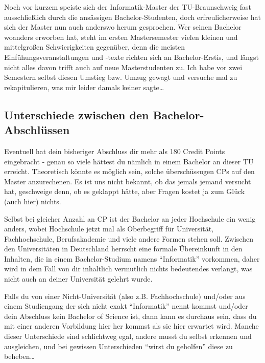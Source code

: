 \begin{multicols}{2}
\label{master}


Noch vor kurzem speiste sich der Informatik-Master der TU-Braunschweig fast ausschließlich durch die ansässigen Bachelor-Studenten, doch erfreulicherweise hat sich der Master nun auch anderswo herum gesprochen. Wer seinen Bachelor woanders erworben hat, steht im ersten Mastersemester vielen kleinen und mittelgroßen Schwierigkeiten gegenüber, denn die meisten Einfühungsveranstaltungen und -texte richten sich an Bachelor-Erstis, und längst nicht alles davon trifft auch auf neue Masterstudenten zu. Ich habe vor zwei Semestern selbst diesen Umstieg bzw. Umzug gewagt und versuche mal zu rekapitulieren, was mir leider damals keiner sagte\ldots


\subsection{Unterschiede zwischen den Bachelor-Abschlüssen}
Eventuell hat dein bisheriger Abschluss dir mehr als 180 Credit Points eingebracht - genau so viele hättest du nämlich in einem Bachelor an dieser TU erreicht. Theoretisch könnte es möglich sein, solche überschüssugen CPs auf den Master anzurechenen. Es ist uns nicht bekannt, ob das jemals jemand versucht hat, geschweige denn, ob es geklappt hätte, aber Fragen kostet ja zum Glück (auch hier) nichts.

Selbst bei gleicher Anzahl an CP ist der Bachelor an jeder Hochschule ein wenig anders, wobei Hochschule jetzt mal als Oberbegriff für Universität, Fachhochschule, Berufsakademie und viele andere Formen stehen soll. Zwischen den Universitäten in Deutschland herrscht eine formale Übereinkunft in den Inhalten, die in einem Bachelor-Studium namens "`Informatik"' vorkommen, daher wird in dem Fall von dir inhaltlich vermutlich nichts bedeutendes verlangt, was nicht auch an deiner Universität gelehrt wurde.

Falls du von einer Nicht-Universität (also z.B. Fachhochschule) und/oder aus einem Studiengang der sich nicht exakt "`Informatik"' nennt kommst und/oder dein Abschluss kein Bachelor of Science ist, dann kann es durchaus sein, dass du mit einer anderen Vorbildung hier her kommst als sie hier erwartet wird. Manche dieser Unterschiede sind schlichtweg egal, andere musst du selbst erkennen und ausgleichen, und bei gewissen Unterschieden "`wirst du geholfen"' diese zu beheben\ldots


\end{multicols}
